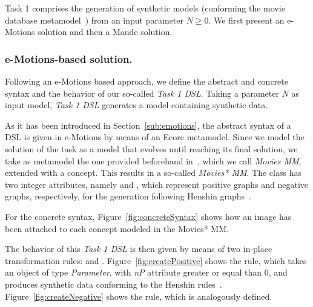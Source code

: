 
Task 1 comprises the generation of synthetic models (conforming the movie database metamodel~\cite{imdbcase}) from an input parameter $N \geq 0$. We first present an e-Motions solution and then a Maude solution. 


\subsubsection{e-Motions-based solution.}

Following an e-Motions based approach, we define the abstract and concrete syntax and the behavior of our so-called \textit{Task 1 DSL}. Taking a parameter $N$ as input model, \textit{Task 1 DSL} generates a model containing synthetic data.

As it has been introduced in Section~\ref{sub:emotions}, the abstract syntax of a DSL is given in e-Motions by means of an Ecore metamodel. Since we model the solution of the task as a model that evolves until reaching its final solution, we take as metamodel the one provided beforehand in~\cite{imdbsources}, which we call \textit{Movies MM}, extended with a  concept. This results in a so-called \textit{Movies* MM}. The class  has two integer attributes, namely  and , which represent positive graphs and negative graphs, respectively, for the generation following Henshin graphs~\cite{Henshin:10}.

For the concrete syntax, Figure~\ref{fig:concreteSyntax} shows how an image has been attached to each concept modeled in the Movies* MM. 

The behavior of this \textit{Task 1 DSL} is then given by means of two in-place transformation rules:  and . Figure~\ref{fig:createPositive} shows the  rule, which takes an object  of type \textit{Parameter}, with \textit{nP} attribute greater or equal than $0$, and produces synthetic data conforming to the Henshin rules~\cite{Henshin:10}. Figure~\ref{fig:createNegative} shows the  rule, which is analogously defined.

